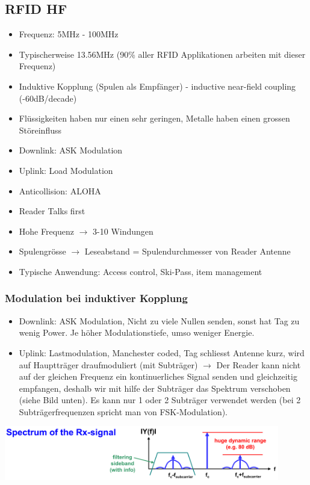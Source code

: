 \subsection{RFID HF}
	\begin{itemize}
		\item Frequenz: 5MHz - 100MHz
		\item Typischerweise 13.56MHz (90\% aller RFID Applikationen arbeiten mit dieser Frequenz)
		\item Induktive Kopplung (Spulen als Empfänger) - inductive near-field coupling (-60dB/decade)
		\item Flüssigkeiten haben nur einen sehr geringen, Metalle haben einen grossen Störeinfluss
		\item Downlink: ASK Modulation
		\item Uplink: Load Modulation
		\item Anticollision: ALOHA
		\item Reader Talks first
		\item Hohe Frequenz $\rightarrow$ 3-10 Windungen
		\item Spulengrösse $\rightarrow$ Leseabstand = Spulendurchmesser von Reader Antenne
		\item Typische Anwendung: Access control, Ski-Pass, item management
	\end{itemize}
\subsubsection{Modulation bei induktiver Kopplung }
	\begin{itemize}
		\item Downlink: ASK Modulation, Nicht zu viele Nullen senden, sonst hat Tag zu wenig Power. Je höher Modulationstiefe, umso weniger Energie. 
		\item Uplink: Lastmodulation, Manchester coded, Tag schliesst Antenne kurz, wird auf Hauptträger draufmoduliert (mit Subträger) $\rightarrow$
		Der Reader kann nicht auf der gleichen Frequenz ein kontinuerliches Signal senden und gleichzeitig empfangen, deshalb wir mit hilfe der Subträger
		das Spektrum verschoben (siehe Bild unten). Es kann nur 1 oder 2 Subträger verwendet werden (bei 2 Subträgerfrequenzen spricht man von FSK-Modulation).
	\end{itemize}
	
	\begin{minipage}{12cm}
		\begin{center}
			\includegraphics[width=12cm]{./bilder/rfid-spectrum.png} 
		\end{center}
	\end{minipage}
	
